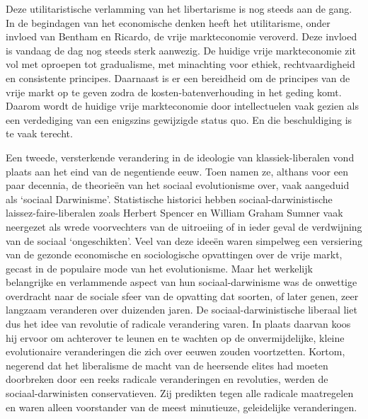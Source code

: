 \documentclass[
  a5paper,
  smalldemyvopaper,10pt,twoside,onecolumn,openright,extrafontsizes,hidelinks]{memoir}
\begin{document}
Deze utilitaristische verlamming van het libertarisme is nog steeds aan
de gang. In de begindagen van het economische denken heeft het
utilitarisme, onder invloed van Bentham en Ricardo, de vrije
markteconomie veroverd. Deze invloed is vandaag de dag nog steeds sterk
aanwezig. De huidige vrije markteconomie zit vol met oproepen tot
gradualisme, met minachting voor ethiek, rechtvaardigheid en consistente
principes. Daarnaast is er een bereidheid om de principes van de vrije
markt op te geven zodra de kosten-batenverhouding in het geding komt.
Daarom wordt de huidige vrije markteconomie door intellectuelen vaak
gezien als een verdediging van een enigszins gewijzigde status quo. En
die beschuldiging is te vaak terecht.

Een tweede, versterkende verandering in de ideologie van
klassiek-liberalen vond plaats aan het eind van de negentiende eeuw.
Toen namen ze, althans voor een paar decennia, de theorieën van het
sociaal evolutionisme over, vaak aangeduid als `sociaal Darwinisme'.
Statistische historici hebben sociaal-darwinistische
laissez-faire-liberalen zoals Herbert Spencer en William Graham Sumner
vaak neergezet als wrede voorvechters van de uitroeiing of in ieder
geval de verdwijning van de sociaal `ongeschikten'. Veel van deze ideeën
waren simpelweg een versiering van de gezonde economische en
sociologische opvattingen over de vrije markt, gecast in de populaire
mode van het evolutionisme. Maar het werkelijk belangrijke en
verlammende aspect van hun sociaal-darwinisme was de onwettige
overdracht naar de sociale sfeer van de opvatting dat soorten, of later
genen, zeer langzaam veranderen over duizenden jaren. De
sociaal-darwinistische liberaal liet dus het idee van revolutie of
radicale verandering varen. In plaats daarvan koos hij ervoor om
achterover te leunen en te wachten op de onvermijdelijke, kleine
evolutionaire veranderingen die zich over eeuwen zouden voortzetten.
Kortom, negerend dat het liberalisme de macht van de heersende elites
had moeten doorbreken door een reeks radicale veranderingen en
revoluties, werden de sociaal-darwinisten conservatieven. Zij predikten
tegen alle radicale maatregelen en waren alleen voorstander van de meest
minutieuze, geleidelijke veranderingen.
\end{document}
